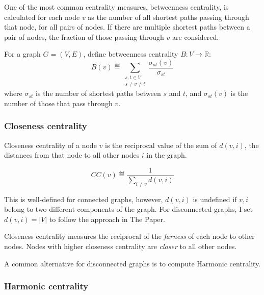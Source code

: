 One of the most common centrality measures, betweenness centrality, is calculated for each node $v$ as the number of all shortest paths passing through that node, for all pairs of nodes.
If there are multiple shortest paths between a pair of nodes, the fraction of those passing through $v$ are considered.

\begin{definition}
    For a graph $G = (V, E)$, define betweenness centrality $B : V \rightarrow \mathbb{R}$:
    \begin{equation*}
        B(v) \eqdef \sum_{\substack{s,t \in V \\ s \ne v \ne t}} \frac{ \sigma_{st}(v) }{ \sigma_{st} }
    \end{equation*}
    where $\sigma_{st}$ is the number of shortest paths between $s$ and $t$, and $\sigma_{st}(v)$ is the number of those that pass through $v$.
\end{definition}

\subsubsection{Closeness centrality}

Closeness centrality of a node $v$ is the reciprocal value of the sum of $d(v, i)$, the distances from that node to all other nodes $i$ in the graph.

\begin{definition}
    \[CC(v) \eqdef \frac{1}{\sum_{i \neq v} d(v, i)}\]
\end{definition}

This is well-defined for connected graphs, however, $d(v, i)$ is undefined if $v, i$ belong to two different components of the graph.
For disconnected graphs, I set $d(v, i) = \left\lvert V \right\rvert$ to follow the approach in The Paper.

Closeness centrality measures the reciprocal of the \textsl{farness} of each node to other nodes.
Nodes with higher closeness centrality are \textsl{closer} to all other nodes.

A common alternative for disconnected graphs is to compute Harmonic centrality.



\subsubsection{Harmonic centrality}

